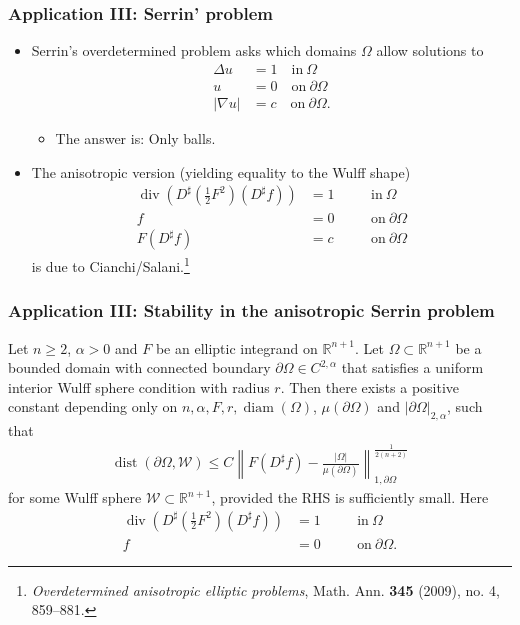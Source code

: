 \documentclass{beamer}
\newcommand{\sub}{\subset}
\newcommand{\bbR}{\mathbb{R}}
\newcommand{\8}{\infty}
\newcommand{\al}{\alpha}
\newcommand{\Om}{\Omega}
\newcommand{\De}{\Delta}
\newcommand{\cW}{\mathcal{W}}
\newcommand{\del}{\partial}
\newcommand{\n}{\nabla}
\newcommand{\tfr}[2]{\tfrac{#1}{#2}}
\DeclareMathOperator{\dive}{div}
\DeclareMathOperator{\dist}{dist}
\DeclareMathOperator{\diam}{diam}
\newcommand{\eq}[1]{\begin{equation}\begin{alignedat}{2} #1 \end{alignedat}\end{equation}}
\newcommand{\abs}[1]{\lvert #1\rvert}
\newcommand{\q}{\quad}
\begin{document}
\begin{frame} 
\frametitle{Application III: Serrin' problem}
\begin{itemize}
\item Serrin's overdetermined problem asks which domains $\Om$ allow solutions to
\eq{\De u & = 1\q \mbox{in}~\Om\\
	u&= 0\q\mbox{on}~\del\Om\\
	\abs{\n u}&=c\q\mbox{on}~\del\Om.}
\begin{itemize}
	\item The answer is: Only balls.
\end{itemize}

\item The anisotropic version (yielding equality to the Wulff shape)
 \eq{\dive(D^{\sharp}(\tfr 12 F^{2})(D^{\sharp }f)) &=1\q &&\mbox{in}~\Om\\
	f&=0\q &&\mbox{on}~\del\Om\\
	F(D^{\sharp}f) &= c\q&&\mbox{on}~\del\Om}
is due to Cianchi/Salani.\footnote{{\it Overdetermined anisotropic elliptic problems}, Math. Ann. {\bf 345} (2009), no. 4, 859--881.}

\end{itemize}


\end{frame}


\begin{frame} 
\frametitle{Application III: Stability in the anisotropic Serrin problem}

\begin{theorem}
Let $n\geq 2$, $\al>0$ and $F$ be an elliptic integrand on $\mathbb{R}^{n+1}$.
Let $\Om\sub \bbR^{n+1}$ be a bounded domain with connected boundary $\del\Om\in C^{2,\al}$ that satisfies a uniform interior Wulff sphere condition with radius $r$. 
Then there exists a positive constant depending only on $n,\al, F,r,\diam(\Om)$, $\mu(\del\Om)$ and $\abs{\del\Om}_{2,\al}$, such that
\eq{
\dist(\del\Om,{\cW})
    \leq C
    \left\|F(D^\sharp f)-\tfrac{\vert\Om\vert}{\mu(\del\Om)}\right\|_{1,\del\Om}^{\frac{1}{2(n+2)}}
}
for some Wulff sphere ${\cW}\subset\mathbb{R}^{n+1}$, provided the RHS is sufficiently small. Here 
 \eq{\dive(D^{\sharp}(\tfr 12 F^{2})(D^{\sharp }f)) &=1\q &&\mbox{in}~\Om\\
	f&=0\q &&\mbox{on}~\del\Om.}
	\end{theorem}
\end{frame}
\end{document}

